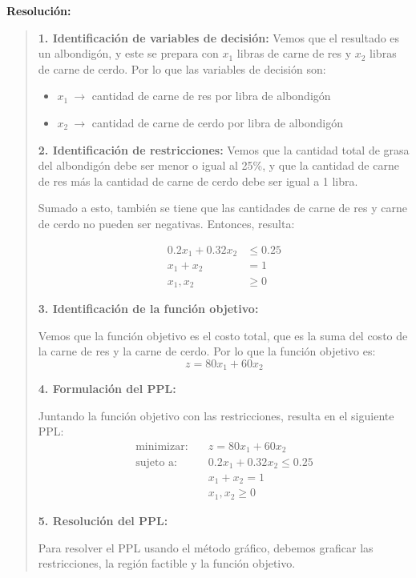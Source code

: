 \noindent\textbf{Resolución:}
\begin{quote}
  \textbf{1. Identificación de variables de decisión:}
  Vemos que el resultado es un albondigón, y este se prepara con \(x_1\) libras de carne de res y \(x_2\) libras de carne de cerdo. Por lo que las variables de decisión son:
  \begin{itemize}
    \item \(x_1 ~\rightarrow\) cantidad de carne de res por libra de albondigón
    \item \(x_2 ~\rightarrow\) cantidad de carne de cerdo por libra de albondigón
  \end{itemize}

  \textbf{2. Identificación de restricciones:}
  Vemos que la cantidad total de grasa del albondigón debe ser menor o igual al 25\%, y que la cantidad de carne de res más la cantidad de carne de cerdo debe ser igual a 1 libra.

  Sumado a esto, también se tiene que las cantidades de carne de res y carne de cerdo no pueden ser negativas. Entonces, resulta:

  \begin{align*}
    0.2x_1 + 0.32x_2 &\leq 0.25 \\
    x_1 + x_2 &= 1 \\
    x_1, x_2 &\geq 0
  \end{align*}

  \textbf{3. Identificación de la función objetivo:}

  Vemos que la función objetivo es el costo total, que es la suma del costo de la carne de res y la carne de cerdo. Por lo que la función objetivo es:
  \[
    z = 80x_1 + 60x_2
  \]

  \textbf{4. Formulación del PPL:}

  Juntando la función objetivo con las restricciones, resulta en el siguiente PPL:
  \begin{align*}
    \text{minimizar:} \quad   &z = 80x_1 + 60x_2 \\[3pt]
    \text{sujeto a:} \quad    &0.2x_1 + 0.32x_2 \leq 0.25 \\
                              &x_1 + x_2 = 1 \\
                              &x_1, x_2 \geq 0
  \end{align*}

  \textbf{5. Resolución del PPL:}

  Para resolver el PPL usando el método gráfico, debemos graficar las restricciones, la región factible y la función objetivo. 


\end{quote}
